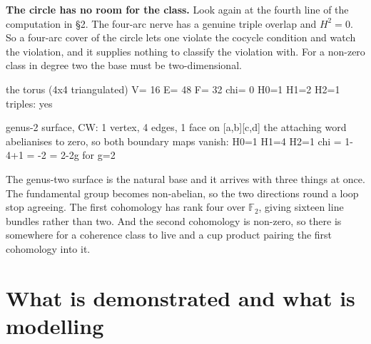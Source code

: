 \documentclass[11pt,a4paper]{article}
\begin{document}
\medskip
\textbf{The circle has no room for the class.} Look again at the fourth line of
the computation in \S2. The four-arc nerve has a genuine triple overlap and
$H^2 = 0$. So a four-arc cover of the circle lets one violate the cocycle
condition and watch the violation, and it supplies nothing to classify the
violation with. For a non-zero class in degree two the base must be
two-dimensional.

\begin{term}
  the torus (4x4 triangulated)       V= 16 E= 48 F= 32  chi=  0   H0=1 H1=2 H2=1   triples: yes

  genus-2 surface, CW: 1 vertex, 4 edges, 1 face on [a,b][c,d]
  the attaching word abelianises to zero, so both boundary maps vanish:
  H0=1 H1=4 H2=1   chi = 1-4+1 = -2 = 2-2g for g=2
\end{term}

The genus-two surface is the natural base and it arrives with three things at
once. The fundamental group becomes non-abelian, so the two directions round a
loop stop agreeing. The first cohomology has rank four over $\mathbb{F}_2$,
giving sixteen line bundles rather than two. And the second cohomology is
non-zero, so there is somewhere for a coherence class to live and a cup product
pairing the first cohomology into it.

\section{What is demonstrated and what is modelling}
\end{document}
